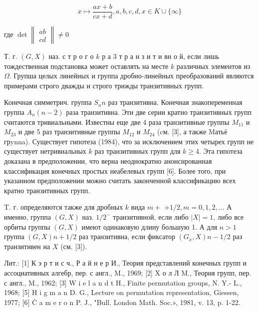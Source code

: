 \documentclass[10pt]{article}
\begin{document}
\[

x \longmapsto \frac{a x+b}{c x+d}, a, b, c, d, x \in K \cup\{\infty\}

\]



где $\operatorname{det}\left\|\begin{array}{l}a b \\ c d\end{array}\right\| \neq 0$



Т. г. $(G, X)$ наз. с т р о г о $k$ р а 3 т р а н з и т и вн о й, если лишь тождественная подстановка может оставлять на месте $k$ различных элементов из $\Omega$. Групша целых линейных и группа дробно-линейных преобразований являются примерами строго дважды и строго трижды транзитивных групп.



Конечная симметрич. группа $S_{n} n$ раз транзитивна. Конечная знакопеременная группа $A_{n}(n-2)$ раза транзитивна. Эти две серии кратно транзитивных групп считаются тривиальными. Известны еще две 4 раза транзитивные группы $M_{11}$ и $M_{23}$ и две 5 раз транзитивные группы $M_{12}$ и $M_{24}$ (cм. [3], а также Mатьё грynna). Существует гипотеза (1984), что за исключением этих четырех групп не существует нетривиальных $k$ раз транзитивных групп для $k \geqslant 4$. Эта гипотеза доказана в предположении, что верна неоднократно анонсированная классификация конечных простых неабелевых групп [6]. Более того, при указанном предположении можно считать законченной классификацию всех кратно транзитивных групп.



T. г. определяются также для дробных $k$ вида $m+$ $+1 / 2, m=0,1,2, \ldots$ А именно, группа $(G, X)$ наз. $1 / 2^{-}$ транзитивной, если либо $|X|=1$, либо все орбиты группы $(G, X)$ имеют одинаковую длину большую 1. А для $n>1$ группа $(G, X) n+1 / 2$ раз транзитивна, если фиксатор $\left(G_{x}, X\right) n-1 / 2$ раз транзитивен на $X$ (см. [3]).



Лит.: [1] К э р т и с ч., Р а й н е р И., Теория представлений конечных групп и ассоциативных алгебр, пер. с англ., M., 1969; [2] X о л Л M., Теория групп, пер. с англ., M., 1962; [3] W i e l a n d t H., Finite permutation groups, N. Y.- L., 1968; [5] H i g m a n D. G., Lecture on permutation representation, Giessen, 1977; [6] Ċ a m e r o n P. J., "Bull. London Math. Soc.», 1981, v. 13, p. 1-22.
\end{document}
